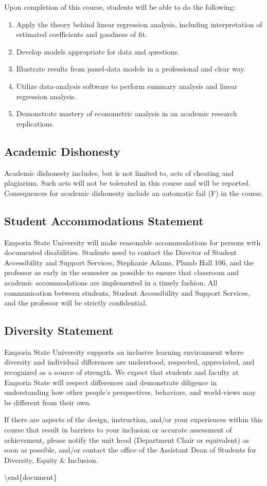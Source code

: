 \documentclass[]{tufte-handout}
\begin{document}
Upon completion of this course, students will be able to do the
following:

\begin{enumerate}
    \item Apply the theory behind linear regression analysis, including interpretation of estimated coefficients and goodness of fit.
    \item Develop models appropriate for data and questions.
    \item Illustrate results from panel-data models in a professional and clear way.
    \item Utilize data-analysis software to perform summary analysis and linear regression analysis.
    \item Demonstrate mastery of econometric analysis in an academic research replications.
    
\end{enumerate}

\subsection*{Academic Dishonesty}

Academic dishonesty includes, but is not limited to, acts of cheating
and plagiarism. Such acts will not be tolerated in this course and will
be reported. Consequences for academic dishonesty include an automatic
fail (F) in the course.

\subsection*{Student Accommodations Statement}

Emporia State University will make reasonable accommodations for persons
with documented disabilities. Students need to contact the Director of
Student Accessibility and Support Services, Stephanie Adams, Plumb Hall
106, and the professor as early in the semester as possible to ensure
that classroom and academic accommodations are implemented in a timely
fashion. All communication between students, Student Accessibility and
Support Services, and the professor will be strictly confidential.

\subsection*{Diversity Statement }

Emporia State University supports an inclusive learning environment
where diversity and individual differences are understood, respected,
appreciated, and recognized as a source of strength. We expect that
students and faculty at Emporia State will respect differences and
demonstrate diligence in understanding how other people's perspectives,
behaviors, and world-views may be different from their own.

If there are aspects of the design, instruction, and/or your experiences
within this course that result in barriers to your inclusion or accurate
assessment of achievement, please notify the unit head (Department Chair
or equivalent) as soon as possible, and/or contact the office of the
Assistant Dean of Students for Diversity, Equity \& Inclusion.

\textbackslash{}end\{document\}
\end{document}
